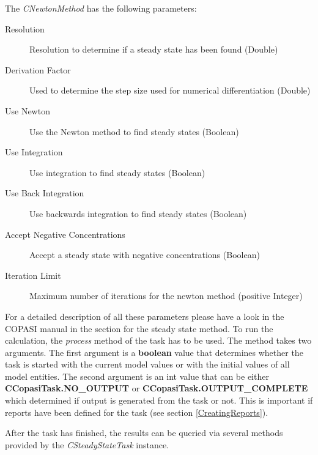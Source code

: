 \documentclass[a4,10pt]{article}
\begin{document}
The \textit{CNewtonMethod} has the following parameters:

\begin{description}
\item[Resolution]{Resolution to determine if a steady state has been found (Double)}
\item[Derivation Factor]{Used to determine the step size used for numerical differentiation (Double)}
\item[Use Newton]{Use the Newton method to find steady states (Boolean) }
\item[Use Integration]{Use integration to find steady states (Boolean)}
\item[Use Back Integration]{Use backwards integration to find steady states (Boolean)}
\item[Accept Negative Concentrations]{Accept a steady state with negative concentrations (Boolean)}
\item[Iteration Limit]{Maximum number of iterations for the newton method (positive Integer)}
\end{description}

For a detailed description of all these parameters please have a look in the COPASI manual in the section for the steady state method.
To run the calculation, the \textit{process} method of the task has to be used. The method takes two arguments. The first argument is a \textbf{boolean} value that determines whether the task is started with the current model values or with the initial values of all model entities. The second argument is an int value that can be either \textbf{CCopasiTask.NO\_OUTPUT} or \textbf{CCopasiTask.OUTPUT\_COMPLETE} which determined if output is generated from the task or not. This is important if reports have been defined for the task (see section \ref{CreatingReports}). 

After the task has finished, the results can be queried via several methods provided by the \textit{CSteadyStateTask} instance.
\end{document}
